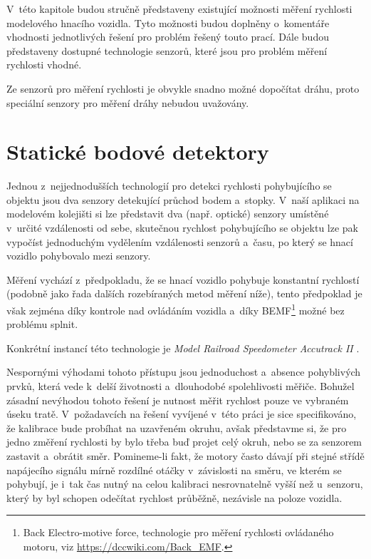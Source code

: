 V~této kapitole budou stručně představeny existující možnosti měření rychlosti
modelového hnacího vozidla. Tyto možnosti budou doplněny o~komentáře vhodnosti
jednotlivých řešení pro problém řešený touto prací. Dále budou představeny
dostupné technologie senzorů, které jsou pro problém měření rychlosti vhodné.

Ze senzorů pro měření rychlosti je obvykle snadno možné dopočítat dráhu, proto
speciální senzory pro měření dráhy nebudou uvažovány.

\section{Statické bodové detektory}
\label{sec:det-static}

Jednou z~nejjednodušších technologií pro detekci rychlosti pohybujícího se
objektu jsou dva senzory detekující průchod bodem a~stopky. V~naší aplikaci na
modelovém kolejišti si lze představit dva (např. optické) senzory umístěné
v~určité vzdálenosti od sebe, skutečnou rychlost pohybujícího se objektu lze
pak vypočíst jednoduchým vydělením vzdálenosti senzorů a~času, po který se
hnací vozidlo pohybovalo mezi senzory.

Měření vychází z~předpokladu, že se hnací vozidlo pohybuje konstantní
rychlostí (podobně jako řada dalších rozebíraných metod měření níže), tento
předpoklad je však zejména díky kontrole nad ovládáním vozidla a~díky
BEMF\footnote{Back Electro-motive force, technologie pro měření rychlosti
ovládaného motoru, viz \url{https://dccwiki.com/Back\_EMF}.}
možné bez problému splnit.

Konkrétní instancí této technologie je \textit{Model Railroad
Speedometer Accutrack II} \cite{accutrackII}.

Nespornými výhodami tohoto přístupu jsou jednoduchost a~absence pohyblivých
prvků, která vede k~delší životnosti a~dlouhodobé spolehlivosti měřiče.
Bohužel zásadní nevýhodou tohoto řešení je nutnost měřit rychlost pouze ve
vybraném úseku tratě. V~požadavcích na řešení vyvíjené v~této práci je sice
specifikováno, že kalibrace bude probíhat na uzavřeném okruhu, avšak představme
si, že pro jedno změření rychlosti by bylo třeba buď projet celý okruh, nebo se
za senzorem zastavit a~obrátit směr. Pomineme-li fakt, že motory často dávají
při stejné střídě napájecího signálu mírně rozdílné otáčky v~závislosti na
směru, ve kterém se pohybují, je i~tak čas nutný na celou kalibraci
nesrovnatelně vyšší než u~senzoru, který by byl schopen odečítat rychlost
průběžně, nezávisle na poloze vozidla.

